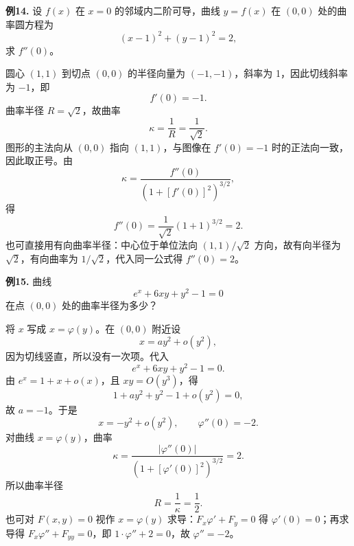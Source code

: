 \begin{problemblock}
\textbf{例14.} 设 \(f(x)\) 在 \(x=0\) 的邻域内二阶可导，曲线 \(y=f(x)\) 在 \((0,0)\) 处的曲率圆方程为
\[
(x-1)^2+(y-1)^2=2,
\]
求 \(f''(0)\)。
\end{problemblock}
\begin{solutionblock}
圆心 \((1,1)\) 到切点 \((0,0)\) 的半径向量为 \((-1,-1)\)，斜率为 1，因此切线斜率为 \(-1\)，即
\[
f'(0)=-1.
\]
曲率半径 \(R=\sqrt2\)，故曲率
\[
\kappa=\frac1R=\frac1{\sqrt2}.
\]
图形的主法向从 \((0,0)\) 指向 \((1,1)\)，与图像在 \(f'(0)=-1\) 时的正法向一致，因此取正号。由
\[
\kappa=\frac{f''(0)}{(1+[f'(0)]^2)^{3/2}},
\]
得
\[
f''(0)=\frac1{\sqrt2}(1+1)^{3/2}=2.
\]
也可直接用有向曲率半径：中心位于单位法向 \((1,1)/\sqrt2\) 方向，故有向半径为 \(\sqrt2\)，有向曲率为 \(1/\sqrt2\)，代入同一公式得 \(f''(0)=2\)。
\end{solutionblock}

\begin{problemblock}
\textbf{例15.} 曲线
\[
e^x+6xy+y^2-1=0
\]
在点 \((0,0)\) 处的曲率半径为多少？
\end{problemblock}
\begin{solutionblock}
将 \(x\) 写成 \(x=\varphi(y)\)。在 \((0,0)\) 附近设
\[
x=ay^2+o(y^2),
\]
因为切线竖直，所以没有一次项。代入
\[
e^x+6xy+y^2-1=0.
\]
由 \(e^x=1+x+o(x)\)，且 \(xy=O(y^3)\)，得
\[
1+ay^2+y^2-1+o(y^2)=0,
\]
故 \(a=-1\)。于是
\[
x=-y^2+o(y^2),\qquad \varphi''(0)=-2.
\]
对曲线 \(x=\varphi(y)\)，曲率
\[
\kappa=\frac{|\varphi''(0)|}{(1+[\varphi'(0)]^2)^{3/2}}=2.
\]
所以曲率半径
\[
R=\frac1\kappa=\frac12.
\]
也可对 \(F(x,y)=0\) 视作 \(x=\varphi(y)\) 求导：\(F_x\varphi'+F_y=0\) 得 \(\varphi'(0)=0\)；再求导得 \(F_x\varphi''+F_{yy}=0\)，即 \(1\cdot\varphi''+2=0\)，故 \(\varphi''=-2\)。
\end{solutionblock}

